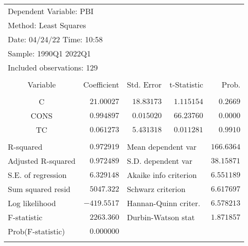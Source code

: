 \documentclass[10pt]{article} %
\begin{document}
\begin{table}[!htbp]
\centering
\begin{tabular}{lrrrr}
\multicolumn{3}{l}{Dependent Variable: PBI}&\multicolumn{1}{c}{}&\multicolumn{1}{c}{}\\
\multicolumn{3}{l}{Method: Least Squares}&\multicolumn{1}{c}{}&\multicolumn{1}{c}{}\\
\multicolumn{3}{l}{Date: 04/24/22   Time: 10:58}&\multicolumn{1}{c}{}&\multicolumn{1}{c}{}\\
\multicolumn{3}{l}{Sample: 1990Q1 2022Q1}&\multicolumn{1}{c}{}&\multicolumn{1}{c}{}\\
\multicolumn{3}{l}{Included observations: 129}&\multicolumn{1}{c}{}&\multicolumn{1}{c}{}\\
[4.5pt] \hline \\ [-4.5pt]
\multicolumn{1}{c}{Variable}&\multicolumn{1}{r}{Coefficient}&\multicolumn{1}{r}{Std. Error}&\multicolumn{1}{r}{t-Statistic}&\multicolumn{1}{r}{Prob.}\\
[4.5pt] \hline \\ [-4.5pt]
\multicolumn{1}{c}{C}&\multicolumn{1}{r}{$21.00027$}&\multicolumn{1}{r}{$18.83173$}&\multicolumn{1}{r}{$1.115154$}&\multicolumn{1}{r}{$0.2669$}\\
\multicolumn{1}{c}{CONS}&\multicolumn{1}{r}{$0.994897$}&\multicolumn{1}{r}{$0.015020$}&\multicolumn{1}{r}{$66.23760$}&\multicolumn{1}{r}{$0.0000$}\\
\multicolumn{1}{c}{TC}&\multicolumn{1}{r}{$0.061273$}&\multicolumn{1}{r}{$5.431318$}&\multicolumn{1}{r}{$0.011281$}&\multicolumn{1}{r}{$0.9910$}\\
[4.5pt] \hline \\ [-4.5pt]
\multicolumn{1}{l}{R-squared}&\multicolumn{1}{r}{$0.972919$}&\multicolumn{2}{l}{Mean dependent var}&\multicolumn{1}{r}{$166.6364$}\\
\multicolumn{1}{l}{Adjusted R-squared}&\multicolumn{1}{r}{$0.972489$}&\multicolumn{2}{l}{S.D. dependent var}&\multicolumn{1}{r}{$38.15871$}\\
\multicolumn{1}{l}{S.E. of regression}&\multicolumn{1}{r}{$6.329148$}&\multicolumn{2}{l}{Akaike info criterion}&\multicolumn{1}{r}{$6.551189$}\\
\multicolumn{1}{l}{Sum squared resid}&\multicolumn{1}{r}{$5047.322$}&\multicolumn{2}{l}{Schwarz criterion}&\multicolumn{1}{r}{$6.617697$}\\
\multicolumn{1}{l}{Log likelihood}&\multicolumn{1}{r}{$-419.5517$}&\multicolumn{2}{l}{Hannan-Quinn criter.}&\multicolumn{1}{r}{$6.578213$}\\
\multicolumn{1}{l}{F-statistic}&\multicolumn{1}{r}{$2263.360$}&\multicolumn{2}{l}{Durbin-Watson stat}&\multicolumn{1}{r}{$1.871857$}\\
\multicolumn{1}{l}{Prob(F-statistic)}&\multicolumn{1}{r}{$0.000000$}&\multicolumn{1}{c}{}&\multicolumn{1}{c}{}&\multicolumn{1}{c}{}\\
[4.5pt] \hline \\ [-4.5pt]
\end{tabular}
\end{table}
\end{document}
